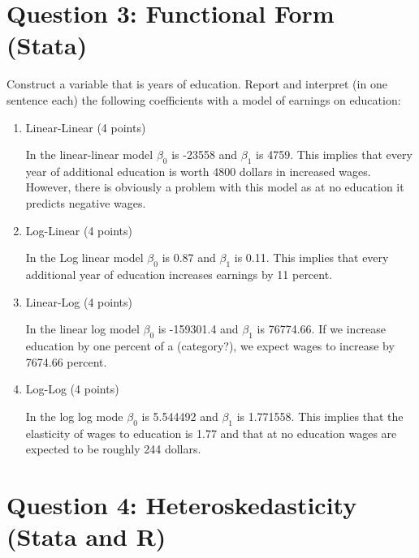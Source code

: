 \documentclass{article}
\begin{document}
\section{Question 3:  Functional Form (Stata)}
Construct a variable that is years of education. Report and interpret (in one sentence each) the following coefficients with a model of earnings on education:

\begin{enumerate}[label=\alph*]

\item Linear-Linear (4 points)

In the linear-linear model $\beta_0$ is -23558 and $\beta_1$ is 4759.  This implies that every year of additional education is worth 4800 dollars in increased wages.  However, there is obviously a problem with this model as at no education it predicts negative wages.

\item Log-Linear (4 points)

In the Log linear model $\beta_0$ is 0.87 and $\beta_1$ is 0.11.  This implies that every additional year of education increases earnings by 11 percent.

\item Linear-Log (4 points)

In the linear log model $\beta_0$ is -159301.4  and $\beta_1$ is 76774.66.  If we increase education by one percent of a (category?), we expect wages to increase by 7674.66 percent. 

\item Log-Log (4 points)

In the log log mode $\beta_0$ is  5.544492 and $\beta_1$ is  1.771558.  This implies that the elasticity of wages to education is 1.77 and that at no education wages are expected to be roughly 244 dollars.

\end{enumerate}

\section{Question 4:  Heteroskedasticity (Stata and R)}
\end{document}
